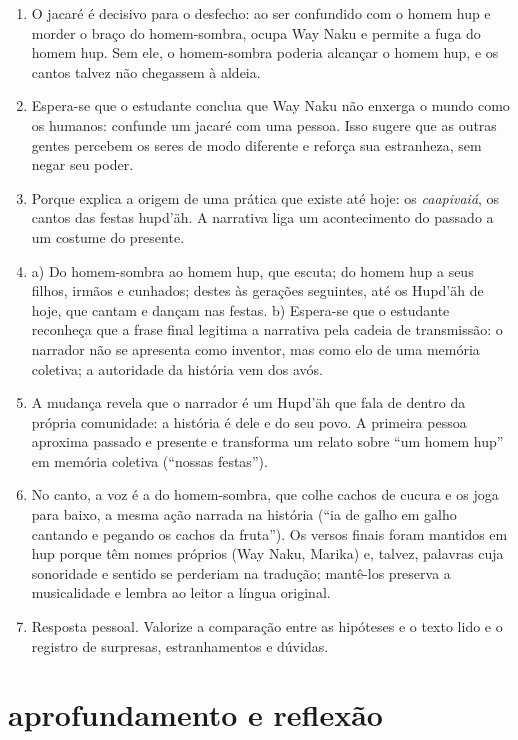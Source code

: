 \begin{enumerate}[label=\arabic*.]
\item O jacaré é decisivo para o desfecho: ao ser confundido com o
homem hup e morder o braço do homem-sombra, ocupa Way Naku e permite a
fuga do homem hup. Sem ele, o homem-sombra poderia alcançar o homem hup,
e os cantos talvez não chegassem à aldeia.

\item Espera-se que o estudante conclua que Way Naku não enxerga o mundo
como os humanos: confunde um jacaré com uma pessoa. Isso sugere que as
outras gentes percebem os seres de modo diferente e reforça sua
estranheza, sem negar seu poder.

\item Porque explica a origem de uma prática que existe até hoje: os
\textit{caapivaiá}, os cantos das festas hupd'äh. A narrativa liga um
acontecimento do passado a um costume do presente.

\item a) Do homem-sombra ao homem hup, que escuta; do homem hup a seus
filhos, irmãos e cunhados; destes às gerações seguintes, até os Hupd'äh
de hoje, que cantam e dançam nas festas. b) Espera-se que o estudante
reconheça que a frase final legitima a narrativa pela cadeia de
transmissão: o narrador não se apresenta como inventor, mas como elo de
uma memória coletiva; a autoridade da história vem dos avós.

\item A mudança revela que o narrador é um Hupd'äh que fala de dentro da
própria comunidade: a história é dele e do seu povo. A primeira pessoa
aproxima passado e presente e transforma um relato sobre ``um homem
hup'' em memória coletiva (``nossas festas'').

\item No canto, a voz é a do homem-sombra, que colhe cachos de cucura e
os joga para baixo, a mesma ação narrada na história (``ia de galho em
galho cantando e pegando os cachos da fruta''). Os versos finais foram
mantidos em hup porque têm nomes próprios (Way Naku, Marika) e, talvez,
palavras cuja sonoridade e sentido se perderiam na tradução; mantê-los
preserva a musicalidade e lembra ao leitor a língua original.

\item Resposta pessoal. Valorize a comparação entre as hipóteses e o
texto lido e o registro de surpresas, estranhamentos e dúvidas.
\end{enumerate}

\section{aprofundamento e reflexão}

